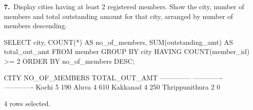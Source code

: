 \noindent\begin{minipage}{\linewidth}
\begingroup{}
{\fontsize{14}{17}\selectfont\textbf{7.}}\ Display cities having at least 2 registered members. Show the city, number of members and total outstanding amount for that city, arranged by number of members descending.\par
\endgroup\vspace{12pt}


\begin{sqlcode}
SELECT city, COUNT(*) AS no_of_members,
       SUM(outstanding_amt) AS total_out_amt
FROM member
GROUP BY city
HAVING COUNT(member_id) >= 2
ORDER BY no_of_members DESC;
\end{sqlcode}

\vspace{18pt}


\begin{sqlout}[fontsize=\small]
CITY            NO_OF_MEMBERS  TOTAL_OUT_AMT
--------------  -------------  -------------
Kochi                       5            190
Aluva                       4            610
Kakkanad                    4            250
Thrippunithura              2              0

4 rows selected.
\end{sqlout}
\end{minipage}\par\vspace{24pt}

